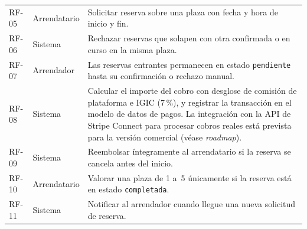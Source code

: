 \begin{table}[htbp]
\begin{tabularx}{\textwidth}{llX}
    \rowcolor{gray!5}
    RF-05       & Arrendatario              & Solicitar reserva sobre una plaza con fecha y hora de inicio y fin.                                                                                                                                                                                                                       \\
    RF-06       & Sistema                   & Rechazar reservas que solapen con otra confirmada o en curso en la misma plaza.                                                                                                                                                                                                           \\
    \rowcolor{gray!5}
    RF-07       & Arrendador                & Las reservas entrantes permanecen en estado \texttt{pendiente} hasta su confirmación o rechazo manual.                                                                                                                                                                                    \\
    RF-08       & Sistema                   & Calcular el importe del cobro con desglose de comisión de plataforma e IGIC (7\,\%), y registrar la transacción en el modelo de datos de pagos. La integración con la API de Stripe Connect para procesar cobros reales está prevista para la versión comercial (véase \textit{roadmap}). \\
    \rowcolor{gray!5}
    RF-09       & Sistema                   & Reembolsar íntegramente al arrendatario si la reserva se cancela antes del inicio.                                                                                                                                                                                                        \\
    RF-10       & Arrendatario              & Valorar una plaza de 1 a~5 únicamente si la reserva está en estado \texttt{completada}.                                                                                                                                                                                                   \\
    \rowcolor{gray!5}
    RF-11       & Sistema                   & Notificar al arrendador cuando llegue una nueva solicitud de reserva.                                                                                                                                                                                                                     \\

\end{tabularx}
\end{table}
